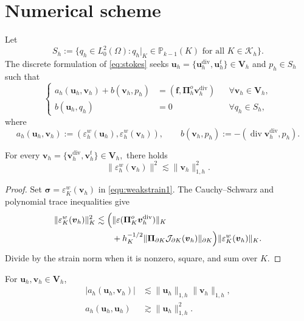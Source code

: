 \documentclass[review,hidelinks,onefignum,onetabnum]{siamart251216}
\begin{document}
\section{Numerical scheme}\label{sec:scheme}
Let
\[
S_h:=\{q_h\in L_0^2(\Omega):q_h|_K\in\mathbb P_{k-1}(K)
\text{ for all }K\in\mathcal K_h\}.
\]
The discrete formulation of \eqref{eq:stokes} seeks
$\boldsymbol u_h=\{\boldsymbol u_h^{\operatorname{div}},\boldsymbol u_h^t\}
\in\boldsymbol V_h$ and $p_h\in S_h$ such that
\begin{equation}\label{eq:scheme}
\left\{\begin{aligned}
a_h(\boldsymbol u_h,\boldsymbol v_h)+b(\boldsymbol v_h,p_h)
&=(\boldsymbol f,\boldsymbol\Pi_h^o\boldsymbol v_h^{\operatorname{div}})
&&\forall\boldsymbol v_h\in\boldsymbol V_h,\\
b(\boldsymbol u_h,q_h)&=0&&\forall q_h\in S_h,
\end{aligned}\right.
\end{equation}
where
\[
a_h(\boldsymbol u_h,\boldsymbol v_h):=
(\varepsilon_h^w(\boldsymbol u_h),\varepsilon_h^w(\boldsymbol v_h)),
\qquad
b(\boldsymbol v_h,p_h):=-(\operatorname{div}\boldsymbol v_h^{\operatorname{div}},p_h).
\]

\begin{lemma}
For every
\(
\boldsymbol{v}_h=\{\boldsymbol{v}_h^{\operatorname{div}},\boldsymbol{v}_h^t\}\in \boldsymbol{V}_h,
\)
there holds
\[
\|\varepsilon_h^w(\boldsymbol{v}_h)\|^2
\lesssim
\|\boldsymbol{v}_h\|_{1,h}^2.
\]
\end{lemma}

\begin{proof}
Set $\boldsymbol\sigma=\varepsilon_K^w(\boldsymbol v_h)$ in
\eqref{equ:weakstrain1}. The Cauchy--Schwarz and polynomial trace inequalities give
\[
\begin{aligned}
\|\varepsilon_K^w(\boldsymbol v_h)\|_K^2
\lesssim\Bigl(&\|\varepsilon(\boldsymbol\Pi_K^o\boldsymbol v_h^{\operatorname{div}})\|_K\\
&+h_K^{-1/2}\|\boldsymbol\Pi_{\partial K}\mathcal J_{\partial K}(\boldsymbol v_h)\|_{\partial K}\Bigr)
\|\varepsilon_K^w(\boldsymbol v_h)\|_K.
\end{aligned}
\]
Divide by the strain norm when it is nonzero, square, and sum over $K$.
\end{proof}


\begin{lemma}\label{lem:10}
For $\boldsymbol u_h,\boldsymbol v_h\in\boldsymbol V_h$,
\begin{align*}
|a_h(\boldsymbol{u}_h, \boldsymbol{v}_h)| &\lesssim \|\boldsymbol{u}_h\|_{1,h} \|\boldsymbol{v}_h\|_{1,h}, \\
a_h(\boldsymbol{u}_h, \boldsymbol{u}_h) &\gtrsim  \|\boldsymbol{u}_h\|_{1,h}^2.
\end{align*}
\end{lemma}
\end{document}
